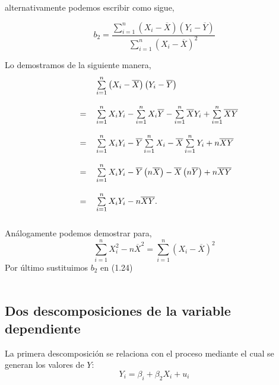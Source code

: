 \begin{multicols}{2}
alternativamente podemos escribir como sigue,\\
\begin{tcolorbox}[colframe = white]
    \begin{equation}
	b_2 = \dfrac{\sum\limits_{i=1}^n \left(X_i - \overline{X}\right) \left(Y_i - \overline{Y}\right)}{\sum\limits_{i=1}^n \left( X_i - \overline{X}\right)^2}
    \end{equation}
\end{tcolorbox}
Lo demostramos de la siguiente manera,\\
\begin{equation}
    \begin{tabular}{rcl}
	&&$\sum\limits_{i=1}^n \left(X_i - \overline{X}\right) \left(Y_i - \overline{Y}\right)$\\\\
	&=&$\sum\limits_{i=1}^n X_iY_i - \sum\limits_{i=1}^n X_i \overline{Y} - \sum\limits_{i=1}^n \overline{X}Y_i + \sum\limits_{i=1}^n \overline{X} \overline{Y}$\\\\
	&=&$\sum\limits_{i=1}^n X_iY_i - \overline{Y}\sum\limits_{i=1}^n X_i - \overline{X}\sum\limits_{i=1}^nY_i + n\overline{XY}$\\\\
	&=&$\sum\limits_{i=1}^n X_iY_i - \overline{Y}\left(n\overline{X}\right) - \overline{X}\left(n\overline{Y}\right)+n\overline{XY}$\\\\
	&=&$\sum\limits_{i=1}^n X_iY_i -n\overline{XY}.$\\\\
    \end{tabular}
\end{equation}
Análogamente podemos demostrar para, \\
\begin{equation}
    \sum\limits_{i=1}^n X_i^2 - n\overline{X}^2 = \sum\limits_{i=1}^n \left(X_i - \overline{X}\right)^2 
\end{equation}
Por último sustituimos $b_2$ en (1.24)\\\\

\subsection{Dos descomposiciones de la variable dependiente}
La primera descomposición se relaciona con el proceso mediante el cual se generan los valores de $Y$:
\begin{equation}
	Y_i = \beta_i + \beta_2X_i + u_i 
\end{equation}


\end{multicols}
